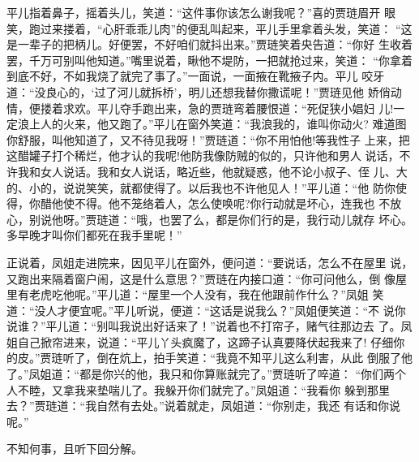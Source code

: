 平儿指着鼻子，摇着头儿，笑道：“这件事你该怎么谢我呢？”喜的贾琏眉开
眼笑，跑过来搂着，“心肝乖乖儿肉”的便乱叫起来，平儿手里拿着头发，笑道：
“这是一辈子的把柄儿。好便罢，不好咱们就抖出来。”贾琏笑着央告道：“你好
生收着罢，千万可别叫他知道。”嘴里说着，瞅他不堤防，一把就抢过来，笑道：
“你拿着到底不好，不如我烧了就完了事了。”一面说，一面掖在靴掖子内。平儿
咬牙道：“没良心的，‘过了河儿就拆桥’，明儿还想我替你撒谎呢！”贾琏见他
娇俏动情，便搂着求欢。平儿夺手跑出来，急的贾琏弯着腰恨道：“死促狭小娼妇
儿!一定浪上人的火来，他又跑了。”平儿在窗外笑道：“我浪我的，谁叫你动火?
难道图你舒服，叫他知道了，又不待见我呀！”贾琏道：“你不用怕他!等我性子
上来，把这醋罐子打个稀烂，他才认的我呢!他防我像防贼的似的，只许他和男人
说话，不许我和女人说话。我和女人说话，略近些，他就疑惑，他不论小叔子、侄
儿、大的、小的，说说笑笑，就都使得了。以后我也不许他见人！”平儿道：“他
防你使得，你醋他使不得。他不笼络着人，怎么使唤呢?你行动就是坏心，连我也
不放心，别说他呀。”贾琏道：“哦，也罢了么，都是你们行的是，我行动儿就存
坏心。多早晚才叫你们都死在我手里呢！”

正说着，凤姐走进院来，因见平儿在窗外，便问道：“要说话，怎么不在屋里
说，又跑出来隔着窗户闹，这是什么意思？”贾琏在内接口道：“你可问他么，倒
像屋里有老虎吃他呢。”平儿道：“屋里一个人没有，我在他跟前作什么？”凤姐
笑道：“没人才便宜呢。”平儿听说，便道：“这话是说我么？”凤姐便笑道：“不
说你说谁？”平儿道：“别叫我说出好话来了！”说着也不打帘子，赌气往那边去
了。凤姐自己掀帘进来，说道：“平儿丫头疯魔了，这蹄子认真要降伏起我来了!
仔细你的皮。”贾琏听了，倒在炕上，拍手笑道：“我竟不知平儿这么利害，从此
倒服了他了。”凤姐道：“都是你兴的他，我只和你算账就完了。”贾琏听了啐道：
“你们两个人不睦，又拿我来垫喘儿了。我躲开你们就完了。”凤姐道：“我看你
躲到那里去？”贾琏道：“我自然有去处。”说着就走，凤姐道：“你别走，我还
有话和你说呢。”

不知何事，且听下回分解。